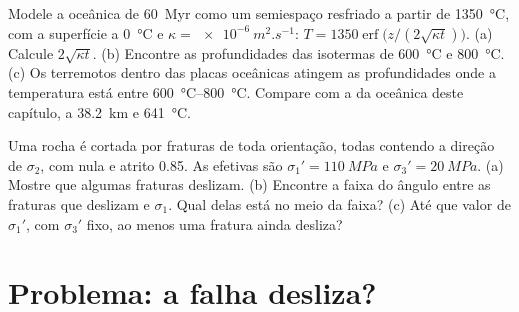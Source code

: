 \begin{exercise}[$\star\star\star$]\label{exo:b1:stress-strain-rheology:11}
Modele a  oceânica de \qty{60}{Myr} como um semiespaço resfriado a partir de \qty{1350}{\degreeCelsius}, com a superfície a \qty{0}{\degreeCelsius} e
$\kappa = \qty{e-6}{m^2.s^{-1}}$: $T = \num{1350}\operatorname{erf}\bigl(z/(2\sqrt{\kappa t})\bigr)$.
(a) Calcule $2\sqrt{\kappa t}$. (b) Encontre as profundidades das isotermas de
\qty{600}{\degreeCelsius} e \qty{800}{\degreeCelsius}. (c) Os terremotos
dentro das placas oceânicas atingem as profundidades onde a temperatura está entre
\qtyrange{600}{800}{\degreeCelsius}. Compare com a  da  oceânica deste capítulo, a
\qty{38.2}{km} e \qty{641}{\degreeCelsius}.
\end{exercise}

\begin{exercise}[$\star\star\star$]\label{exo:b1:stress-strain-rheology:12}
Uma rocha é cortada por fraturas de toda orientação, todas contendo a direção de $\sigma_2$, com  nula e atrito 0.85. As  efetivas são $\sigma_1' = \qty{110}{MPa}$ e
$\sigma_3' = \qty{20}{MPa}$. (a) Mostre que algumas fraturas deslizam. (b) Encontre a faixa do ângulo entre as fraturas que deslizam e $\sigma_1$. Qual delas está no meio da faixa? (c) Até que valor de $\sigma_1'$, com $\sigma_3'$ fixo, ao menos uma fratura ainda desliza?
\end{exercise}

\section{Problema: a falha desliza?}


